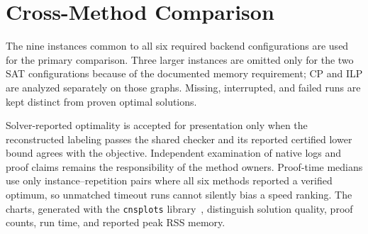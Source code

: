 \section{Cross-Method Comparison}\label{sec:comparison}

The nine instances common to all six required backend configurations are
used for the primary comparison. Three larger instances are omitted only
for the two SAT configurations because of the documented memory requirement;
CP and ILP are analyzed separately on those graphs. Missing, interrupted,
and failed runs are kept distinct from proven optimal solutions.

Solver-reported optimality is accepted for presentation only when the
reconstructed labeling passes the shared checker and its reported certified
lower bound agrees with the objective. Independent examination of native
logs and proof claims remains the responsibility of the method owners.
Proof-time medians use only instance--repetition pairs where all six methods
reported a verified optimum, so unmatched timeout runs cannot silently
bias a speed ranking. The charts, generated with 
the \texttt{cnsplots} library~\cite{cnsplots}, distinguish solution quality, proof
counts, run time, and reported peak RSS memory.
